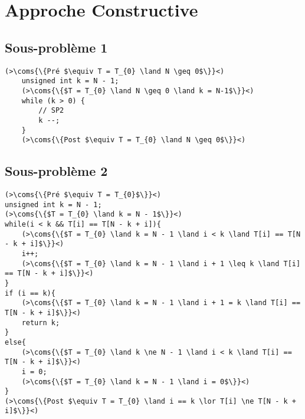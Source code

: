 \section{Approche Constructive}


\subsection{Sous-problème 1}
\begin{lstlisting}[caption={Sous-problème 1}]
    (>\coms{\{Pré $\equiv T = T_{0} \land N \geq 0$\}}<)
    unsigned int k = N - 1;
    (>\coms{\{$T = T_{0} \land N \geq 0 \land k = N-1$\}}<)
    while (k > 0) {
        // SP2
        k --;
    }
    (>\coms{\{Post $\equiv T = T_{0} \land N \geq 0$\}}<)
\end{lstlisting}


\subsection{Sous-problème 2}


\begin{lstlisting}[caption={Sous-problème 2}]
(>\coms{\{Pré $\equiv T = T_{0}$\}}<)
unsigned int k = N - 1;
(>\coms{\{$T = T_{0} \land k = N - 1$\}}<)
while(i < k && T[i] == T[N - k + i]){
    (>\coms{\{$T = T_{0} \land k = N - 1 \land i < k \land T[i] == T[N - k + i]$\}}<)
    i++;
    (>\coms{\{$T = T_{0} \land k = N - 1 \land i + 1 \leq k \land T[i] == T[N - k + i]$\}}<)
}
if (i == k){
    (>\coms{\{$T = T_{0} \land k = N - 1 \land i + 1 = k \land T[i] == T[N - k + i]$\}}<)
    return k;
}
else{
    (>\coms{\{$T = T_{0} \land k \ne N - 1 \land i < k \land T[i] == T[N - k + i]$\}}<)
    i = 0;
    (>\coms{\{$T = T_{0} \land k = N - 1 \land i = 0$\}}<)
}
(>\coms{\{Post $\equiv T = T_{0} \land i == k \lor T[i] \ne T[N - k + i]$\}}<)
\end{lstlisting}
